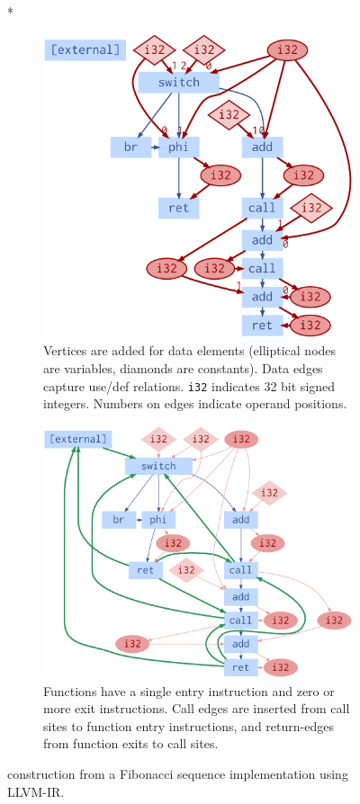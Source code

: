 \begin{figure}[t]
  \\*
  \begin{subfigure}[t]{.46\linewidth}%
  	\includegraphics[width=.72\linewidth]{images/C_Data}%
    \captionsetup{width=.95\linewidth}%
  	\caption{%
      Vertices are added for data elements (elliptical nodes are variables,
      diamonds are constants). Data edges capture use/def relations.
      \texttt{i32} indicates 32 bit signed integers. Numbers on edges indicate
      operand positions.} \label{subfigure:data_flow}%
	\end{subfigure}
	\quad
  \begin{subfigure}[t]{.46\linewidth}%
	  \includegraphics[width=.85\linewidth]{images/D_Call}%
    \captionsetup{width=.95\linewidth}%
	  \caption{%
      Functions have a single entry instruction and zero or more exit
      instructions. Call edges are inserted from call sites to function entry
      instructions, and return-edges from function exits to call sites.%
    }
	  \label{subfigure:call_flow}%
	\end{subfigure}
  \caption{%
    \programl construction from a Fibonacci sequence implementation using
    LLVM-IR.%
  }%
  \label{figure:graph_construction}%
  \vspace{-1em}
\end{figure}

